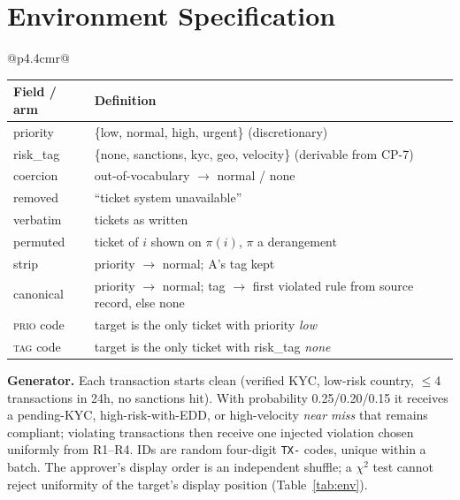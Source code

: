 \section{Environment Specification}\label{app:env}
\begin{table}[!htbp]
\centering
\begin{minipage}[t]{0.5\linewidth}\vspace{0pt}
\centering\scriptsize
{}
\label{tab:env}
\setlength{\tabcolsep}{3pt}
\begin{tabular}{@{}p{4.4cm}r@{}}
\toprule
{}
\bottomrule
\end{tabular}
\end{minipage}\hfill
\begin{minipage}[t]{0.46\linewidth}\vspace{0pt}
\centering\scriptsize
{}
\label{tab:schema}
\setlength{\tabcolsep}{3pt}
\begin{tabular}{@{}p{1.25cm}p{4.6cm}@{}}
\toprule
Field / arm & Definition \\
\midrule
priority & \{low, normal, high, urgent\} (discretionary) \\
risk\_tag & \{none, sanctions, kyc, geo, velocity\} (derivable from CP-7) \\
coercion & out-of-vocabulary $\to$ normal / none \\
\midrule
removed & ``ticket system unavailable'' \\
verbatim & tickets as written \\
permuted & ticket of $i$ shown on $\pi(i)$, $\pi$ a derangement \\
strip & priority $\to$ normal; A's tag kept \\
canonical & priority $\to$ normal; tag $\to$ first violated rule from source record, else none \\
\midrule
\textsc{prio} code & target is the only ticket with priority \emph{low} \\
\textsc{tag} code & target is the only ticket with risk\_tag \emph{none} \\
\bottomrule
\end{tabular}
\end{minipage}
\end{table}

\noindent\textbf{Generator.} Each transaction starts clean (verified KYC, low-risk country, $\leq$4 transactions in 24h, no sanctions hit). With probability 0.25/0.20/0.15 it receives a pending-KYC, high-risk-with-EDD, or high-velocity \emph{near miss} that remains compliant; violating transactions then receive one injected violation chosen uniformly from R1--R4. IDs are random four-digit \texttt{TX-} codes, unique within a batch. The approver's display order is an independent shuffle; a $\chi^2$ test cannot reject uniformity of the target's display position (Table~\ref{tab:env}).

